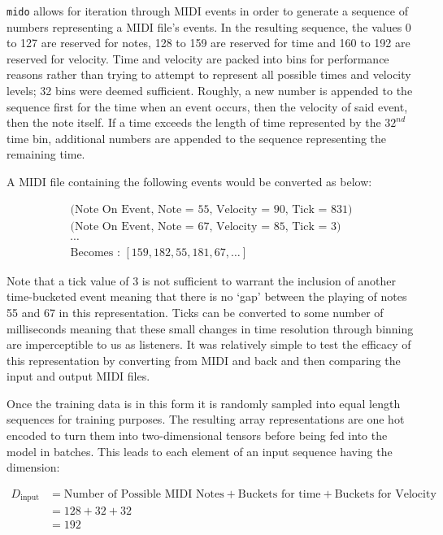 \documentclass[12pt,]{article}
\begin{document}
\texttt{mido} allows for iteration through MIDI events in order to
generate a sequence of numbers representing a MIDI file's events. In the
resulting sequence, the values 0 to 127 are reserved for notes, 128 to
159 are reserved for time and 160 to 192 are reserved for velocity. Time
and velocity are packed into bins for performance reasons rather than
trying to attempt to represent all possible times and velocity levels;
32 bins were deemed sufficient. Roughly, a new number is appended to the
sequence first for the time when an event occurs, then the velocity of
said event, then the note itself. If a time exceeds the length of time
represented by the \(32^{nd}\) time bin, additional numbers are appended
to the sequence representing the remaining time.

A MIDI file containing the following events would be converted as below:

\[\begin{gathered}
\text{(Note On Event, Note = 55, Velocity = 90, Tick = 831)} \\
\text{(Note On Event, Note = 67, Velocity = 85, Tick = 3)}\\
\cdots\\
\text{Becomes : } [159, 182, 55, 181, 67, \dots]
\end{gathered}\]

Note that a tick value of 3 is not sufficient to warrant the inclusion
of another time-bucketed event meaning that there is no `gap' between
the playing of notes 55 and 67 in this representation. Ticks can be
converted to some number of milliseconds meaning that these small
changes in time resolution through binning are imperceptible to us as
listeners. It was relatively simple to test the efficacy of this
representation by converting from MIDI and back and then comparing the
input and output MIDI files.

Once the training data is in this form it is randomly sampled into equal
length sequences for training purposes. The resulting array
representations are one hot encoded to turn them into two-dimensional
tensors before being fed into the model in batches. This leads to each
element of an input sequence having the dimension:

\[\begin{aligned}
D_{\text{input}} &= \text{Number of Possible MIDI Notes} + \text{Buckets for time} + \text{Buckets for Velocity}\\
&= 128 + 32 + 32\\
&= 192
\end{aligned}\]
\end{document}
